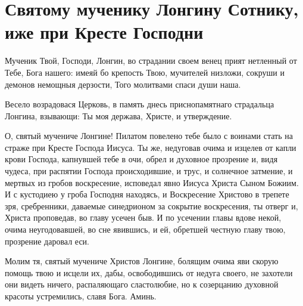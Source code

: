\mychapterending


\section{Святому мученику Лонгину Сотнику, иже при Кресте Господни}\begin{mymulticols}


Мученик Твой, Господи, Лонгин, во страдании своем венец прият нетленный от Тебе, Бога нашего: имеяй бо крепость Твою, мучителей низложи, сокруши и демонов немощныя дерзости, Того молитвами спаси души наша.


Весело возрадовася Церковь, в память днесь приснопамятнаго страдальца Лонгина, взывающи: Ты моя держава, Христе, и утверждение.


О, святый мучениче Лонгине! Пилатом повелено тебе было с воинами стать на страже при Кресте Господа Иисуса. Ты же, недуговав очима и изцелев от капли крови Господа, капнувшей тебе в очи, обрел и духовное прозрение и, видя чудеса, при распятии Господа происходившие, и трус, и солнечное затмение, и мертвых из гробов воскресение, исповедал явно Иисуса Христа Сыном Божиим. И с кустодиею у гроба Господня находясь, и Воскресение Христово в трепете зря, сребренники, даваемые синедрионом за сокрытие воскресения, ты отверг и, Христа проповедав, во главу усечен быв. И по усечении главы вдове некой, очима неугодовавшей, во сне явившись, и ей, обретшей честную главу твою, прозрение даровал еси. 

Молим тя, святый мучениче Христов Лонгине, болящим очима яви скорую помощь твою и исцели их, дабы, освободившись от недуга своего, не захотели они видеть ничего, распаляющаго сластолюбие, но к созерцанию духовной красоты устремились, славя Бога. Аминь.

\end{mymulticols}

